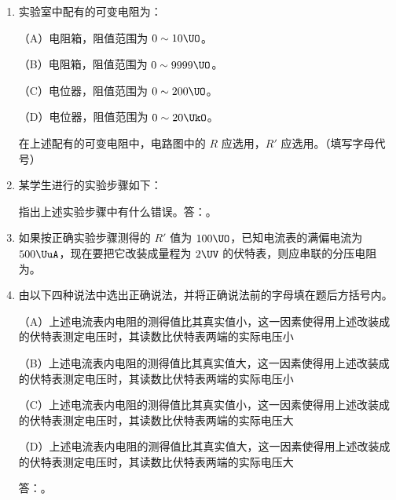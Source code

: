 \documentclass[\gkver]{gaokaozhenti}
\begin{document}
\begin{enumerate}
\begin{enumerate}
	\item
	实验室中配有的可变电阻为：

	（A）电阻箱，阻值范围为 $0\sim10\UO$。

	（B）电阻箱，阻值范围为 $0\sim9999\UO$。

	（C）电位器，阻值范围为 $0\sim200\UO$。

	（D）电位器，阻值范围为 $0\sim20\UkO$。

	在上述配有的可变电阻中，电路图中的 $R$ 应选用，$R'$ 应选用。（填写字母代号）
	\item
	某学生进行的实验步骤如下：


	指出上述实验步骤中有什么错误。答：。
	\item
	如果按正确实验步骤测得的 $R'$ 值为 $100\UO$，已知电流表的满偏电流为 $500\UuA$，现在要把它改装成量程为 $2\UV$ 的伏特表，则应串联的分压电阻为\tkanswer[1.4cm]{$3900\UO$}。
	\item
	由以下四种说法中选出正确说法，并将正确说法前的字母填在题后方括号内。

	（A）上述电流表内电阻的测得值比其真实值小，这一因素使得用上述改装成的伏特表测定电压时，其读数比伏特表两端的实际电压小

	（B）上述电流表内电阻的测得值比其真实值大，这一因素使得用上述改装成的伏特表测定电压时，其读数比伏特表两端的实际电压小

	（C）上述电流表内电阻的测得值比其真实值小，这一因素使得用上述改装成的伏特表测定电压时，其读数比伏特表两端的实际电压大

	（D）上述电流表内电阻的测得值比其真实值大，这一因素使得用上述改装成的伏特表测定电压时，其读数比伏特表两端的实际电压大

	答：。
\end{enumerate}

\end{enumerate}
\end{document}
